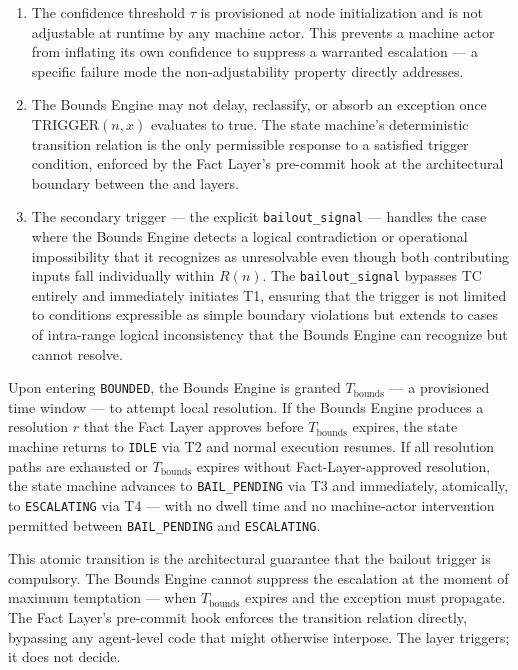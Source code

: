 \begin{enumerate}\itemsep=0pt
\item The confidence threshold $\tau$ is provisioned at node initialization and is not adjustable at runtime by any machine actor. This prevents a machine actor from inflating its own confidence to suppress a warranted escalation — a specific failure mode the non-adjustability property directly addresses.

\item The Bounds Engine may not delay, reclassify, or absorb an exception once $\text{TRIGGER}(n, x)$ evaluates to true. The state machine's deterministic transition relation is the only permissible response to a satisfied trigger condition, enforced by the Fact Layer's pre-commit hook at the architectural boundary between the \bounds{} and \fact{} layers.

\item The secondary trigger — the explicit \texttt{bailout\_signal} — handles the case where the Bounds Engine detects a logical contradiction or operational impossibility that it recognizes as unresolvable even though both contributing inputs fall individually within $R(n)$. The \texttt{bailout\_signal} bypasses TC entirely and immediately initiates T1, ensuring that the trigger is not limited to conditions expressible as simple boundary violations but extends to cases of intra-range logical inconsistency that the Bounds Engine can recognize but cannot resolve.
\end{enumerate}

Upon entering \texttt{BOUNDED}, the Bounds Engine is granted $T_{\text{bounds}}$ — a provisioned time window — to attempt local resolution. If the Bounds Engine produces a resolution $r$ that the Fact Layer approves before $T_{\text{bounds}}$ expires, the state machine returns to \texttt{IDLE} via T2 and normal execution resumes. If all resolution paths are exhausted or $T_{\text{bounds}}$ expires without Fact-Layer-approved resolution, the state machine advances to \texttt{BAIL\_PENDING} via T3 and immediately, atomically, to \texttt{ESCALATING} via T4 — with no dwell time and no machine-actor intervention permitted between \texttt{BAIL\_PENDING} and \texttt{ESCALATING}.

This atomic transition is the architectural guarantee that the bailout trigger is compulsory. The Bounds Engine cannot suppress the escalation at the moment of maximum temptation — when $T_{\text{bounds}}$ expires and the exception must propagate. The Fact Layer's pre-commit hook enforces the transition relation directly, bypassing any agent-level code that might otherwise interpose. The \bounds{} layer triggers; it does not decide.

